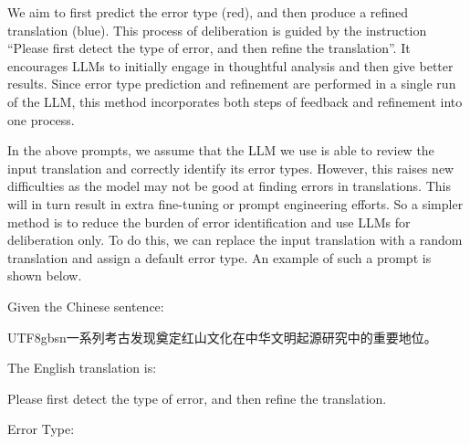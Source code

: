 We aim to first predict the error type (red), and then produce a refined translation (blue). This process of deliberation is guided by the instruction ``Please first detect the type of error, and then refine the translation''. It encourages LLMs to initially engage in thoughtful analysis and then give better results. Since error type prediction and refinement are performed in a single run of the LLM, this method incorporates both steps of feedback and refinement into one process.

In the above prompts, we assume that the LLM we use is able to review the input translation and correctly identify its error types. However, this raises new difficulties as the model may not be good at finding errors in translations. This will in turn result in extra fine-tuning or prompt engineering efforts. So a simpler method is to reduce the burden of error identification and use LLMs for deliberation only. To do this, we can replace the input translation with a random translation and assign a default error type. An example of such a prompt is shown below.

\vspace{0.5em}
\begin{tcolorbox}

\begingroup
\setlength{\leftskip}{2em}
\setlength{\rightskip}{2em}

Given the Chinese sentence:

\vspace{0.2em}

\begin{CJK*}{UTF8}{gbsn}一系列考古发现奠定红山文化在中华文明起源研究中的重要地位。\end{CJK*}

\vspace{0.2em}

The English translation is:

\vspace{0.2em}


\vspace{0.5em}

Please first detect the type of error, and then refine the translation.

\vspace{0.2em}

Error Type: 

\vspace{0.2em}

\underline{}

\endgroup

\end{tcolorbox}
\vspace{0.5em}

